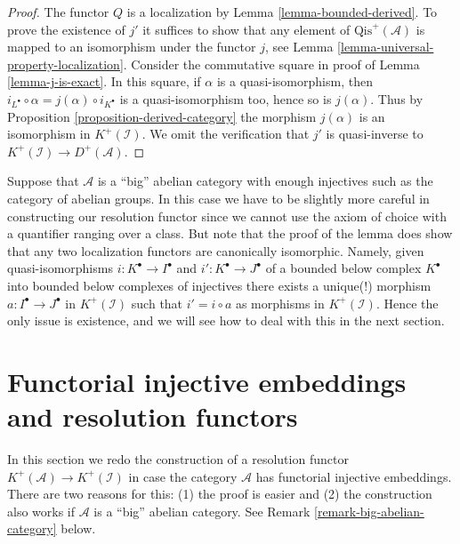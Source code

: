 \begin{proof}
The functor $Q$ is a localization by
Lemma \ref{lemma-bounded-derived}.
To prove the existence of $j'$ it suffices to show that any element of
$\text{Qis}^{+}(\mathcal{A})$ is mapped to an isomorphism under
the functor $j$, see Lemma \ref{lemma-universal-property-localization}.
Consider the commutative square in proof of
Lemma \ref{lemma-j-is-exact}. In this square, if $\alpha$ is a
quasi-isomorphism, then $i_{L^\bullet}\circ\alpha=j(\alpha)\circ i_{K^\bullet}$
is a quasi-isomorphism too, hence so is $j(\alpha)$. Thus by
Proposition \ref{proposition-derived-category} the morphism
$j(\alpha)$ is an isomorphism in $K^+(\mathcal{I})$. We omit the
verification that $j'$ is quasi-inverse to
$K^{+}(\mathcal{I}) \to D^{+}(\mathcal{A})$.
\end{proof}

\begin{remark}
\label{remark-big-localization}
Suppose that $\mathcal{A}$ is a ``big'' abelian category with enough injectives
such as the category of abelian groups. In this case we have to be slightly
more careful in constructing our resolution functor since we cannot use
the axiom of choice with a quantifier ranging over a class. But note that
the proof of the lemma does show that any two localization functors are
canonically isomorphic. Namely, given quasi-isomorphisms
$i : K^\bullet \to I^\bullet$ and $i' : K^\bullet \to J^\bullet$ of
a bounded below complex $K^\bullet$ into bounded below complexes of injectives
there exists a unique(!) morphism $a : I^\bullet \to J^\bullet$
in $K^{+}(\mathcal{I})$ such that $i' = i \circ a$ as morphisms in
$K^{+}(\mathcal{I})$. Hence the only issue is existence, and we will see how
to deal with this in the next section.
\end{remark}










\section{Functorial injective embeddings and resolution functors}
\label{section-functorial-injective-resolutions}

\noindent
In this section we redo the construction of a resolution functor
$K^{+}(\mathcal{A}) \to K^{+}(\mathcal{I})$ in case the
category $\mathcal{A}$ has functorial injective embeddings.
There are two reasons for this: (1) the proof is easier and (2)
the construction also works if $\mathcal{A}$ is a ``big'' abelian
category. See
Remark \ref{remark-big-abelian-category}
below.

